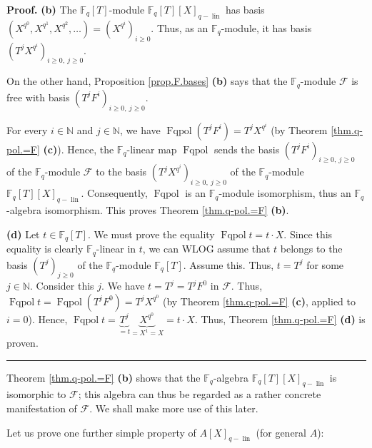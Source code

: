 \documentclass[numbers=enddot,12pt,final,onecolumn,notitlepage]{scrartcl}%
\theoremstyle{definition}
\newenvironment{proof}[1][Proof]{\noindent\textbf{#1.} }{\ \rule{0.5em}{0.5em}}
\begin{document}
\begin{proof}
\textbf{(b)} The $\mathbb{F}_{q}\left[  T\right]  $-module $\mathbb{F}%
_{q}\left[  T\right]  \left[  X\right]  _{q-\operatorname*{lin}}$ has basis
$\left(  X^{q^{0}},X^{q^{1}},X^{q^{2}},\ldots\right)  =\left(  X^{q^{i}%
}\right)  _{i\geq0}$. Thus, as an $\mathbb{F}_{q}$-module, it has basis
$\left(  T^{j}X^{q^{i}}\right)  _{i\geq0,\ j\geq0}$.

On the other hand, Proposition \ref{prop.F.bases} \textbf{(b)} says that the
$\mathbb{F}_{q}$-module $\mathcal{F}$ is free with basis $\left(  T^{j}%
F^{i}\right)  _{i\geq0,\ j\geq0}$.

For every $i\in\mathbb{N}$ and $j\in\mathbb{N}$, we have
$\operatorname*{Fqpol}\left(  T^{j}F^{i}\right)  =T^{j}X^{q^{i}}$ (by Theorem
\ref{thm.q-pol.=F} \textbf{(c)}). Hence, the $\mathbb{F}_{q}$-linear map
$\operatorname*{Fqpol}$ sends the basis $\left(  T^{j}F^{i}\right)
_{i\geq0,\ j\geq0}$ of the $\mathbb{F}_{q}$-module $\mathcal{F}$ to the basis
$\left(  T^{j}X^{q^{i}}\right)  _{i\geq0,\ j\geq0}$ of the $\mathbb{F}_{q}%
$-module $\mathbb{F}_{q}\left[  T\right]  \left[  X\right]
_{q-\operatorname*{lin}}$. Consequently, $\operatorname*{Fqpol}$ is an
$\mathbb{F}_{q}$-module isomorphism, thus an $\mathbb{F}_{q}$-algebra
isomorphism. This proves Theorem \ref{thm.q-pol.=F} \textbf{(b)}.

\textbf{(d)} Let $t\in\mathbb{F}_{q}\left[  T\right]  $. We must prove the
equality $\operatorname*{Fqpol}t=t\cdot X$. Since this equality is clearly
$\mathbb{F}_{q}$-linear in $t$, we can WLOG assume that $t$ belongs to the
basis $\left(  T^{j}\right)  _{j\geq0}$ of the $\mathbb{F}_{q}$-module
$\mathbb{F}_{q}\left[  T\right]  $. Assume this. Thus, $t=T^{j}$ for some
$j\in\mathbb{N}$. Consider this $j$. We have $t=T^{j}=T^{j}F^{0}$ in
$\mathcal{F}$. Thus, $\operatorname*{Fqpol}t=\operatorname*{Fqpol}\left(
T^{j}F^{0}\right)  =T^{j}X^{q^{0}}$ (by Theorem \ref{thm.q-pol.=F}
\textbf{(c)}, applied to $i=0$). Hence, $\operatorname*{Fqpol}%
t=\underbrace{T^{j}}_{=t}\underbrace{X^{q^{0}}}_{=X^{1}=X}=t\cdot X$. Thus,
Theorem \ref{thm.q-pol.=F} \textbf{(d)} is proven.
\end{proof}

Theorem \ref{thm.q-pol.=F} \textbf{(b)} shows that the $\mathbb{F}_{q}%
$-algebra $\mathbb{F}_{q}\left[  T\right]  \left[  X\right]
_{q-\operatorname*{lin}}$ is isomorphic to $\mathcal{F}$; this algebra can
thus be regarded as a rather concrete manifestation of $\mathcal{F}$. We shall
make more use of this later.

Let us prove one further simple property of $A\left[  X\right]
_{q-\operatorname*{lin}}$ (for general $A$):
\end{document}
